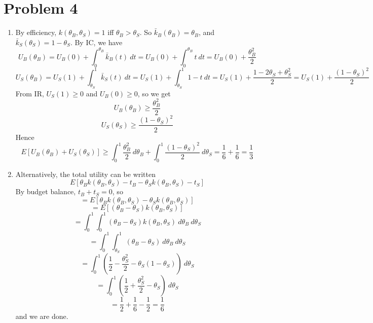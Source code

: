 \documentclass[10pt,letter]{article}
\begin{document}
\section*{Problem 4}
\begin{enumerate}[label=(\alph*)]
  \item By efficiency, $k(\theta_B, \theta_S) = 1$ iff $\theta_B > \theta_S$. So $\bar{k}_B(\theta_B) = \theta_B$, and $\bar{k}_S(\theta_S) = 1-\theta_S$. By IC, we have
  \[ U_B(\theta_B) = U_B(0) + \int_0^{\theta_B} \bar{k}_B(t) \ dt = U_B(0) + \int_0^{\theta_B} t \ dt = U_B(0) + \frac{\theta_B^2}{2} \]
  \[ U_S(\theta_B) = U_S(1) + \int_{\theta_S}^{1} \bar{k}_S(t) \ dt = U_S(1) + \int_{\theta_S}^1 1-t \ dt = U_S(1) + \frac{1 -2\theta_S + \theta_S^2}{2} = U_S(1) + \frac{(1-\theta_S)^2}{2}  \]
  From IR, $U_S(1) \ge 0$ and $U_B(0) \ge 0$, so we get
  \[ U_B(\theta_B) \ge \frac{\theta_B^2}{2}  \]
  \[ U_S(\theta_S) \ge \frac{(1-\theta_S)^2}{2} \]
  Hence
  \[ E[U_B(\theta_B) + U_S(\theta_S)] \ge \int_0^1 \frac{\theta_B^2}{2} \ d\theta_B + \int_0^1 \frac{(1-\theta_S)^2}{2} \ d\theta_S = \frac{1}{6} + \frac{1}{6} =\frac{1}{3} \]
  \item Alternatively, the total utility can be written
  \[ E[\theta_B k(\theta_B, \theta_S) - t_B - \theta_S k(\theta_B, \theta_S) - t_S] \]
  By budget balance, $t_B + t_S = 0$, so
  \[ =E[\theta_B k(\theta_B, \theta_S)  - \theta_S k(\theta_B, \theta_S) ] \]
  \[ =E[(\theta_B-\theta_S) k(\theta_B, \theta_S)] \]
  \[ = \int_0^1 \int_0^1 (\theta_B - \theta_S)k(\theta_B, \theta_S)  \ d\theta_B \ d\theta_S\]
  \[ = \int_0^1 \int_{\theta_S}^1 (\theta_B - \theta_S)  \ d\theta_B \ d\theta_S\]
  \[ = \int_0^1  \left(\frac{1}{2} - \frac{\theta_S^2}{2} - \theta_S(1-\theta_S)\right)  \ d\theta_S\]
  \[ = \int_0^1  \left(\frac{1}{2} + \frac{\theta_S^2}{2} - \theta_S \right)  \ d\theta_S\]
  \[ = \frac{1}{2} + \frac{1}{6} - \frac{1}{2} = \frac{1}{6} \]
  and we are done.
\end{enumerate}
\end{document}
